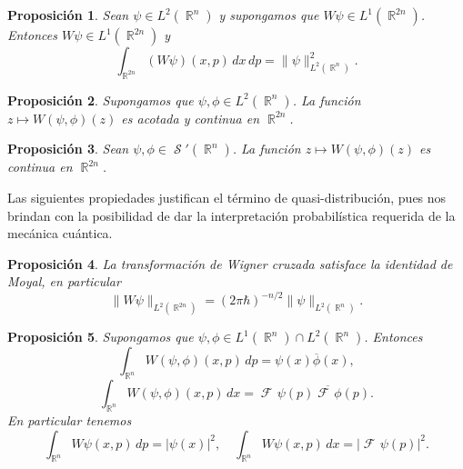 \documentclass[a4paper]{report}
\DeclareMathOperator{\R}{\mathbb{R}}
\DeclareMathOperator{\Sz}{\mathcal S}
\DeclareMathOperator{\Fr}{\mathcal{F}\!}
\newtheorem{proposition}{Proposición}
\begin{document}
  \begin{proposition}
    Sean $\psi \in L^2(\R^{n})$ y supongamos que $W\psi \in
    L^{1}(\R^{2n})$. Entonces $W\psi \in L^{1}(\R^{2n})$ y
    \begin{equation}
      \int_{\R^{2n}} (W\psi)(x,p) \, dx \, dp 
      = \|\psi\|^2_{L^2(\R^{n})}.
    \end{equation}
  \end{proposition}

  \begin{proposition}
    Supongamos que $\psi, \phi \in L^2(\R^{n})$. La función
    $z \mapsto W(\psi,\phi)(z)$ es acotada y continua en
    $\R^{2n}$.
  \end{proposition}

  \begin{proposition}
    Sean $\psi,\phi \in \Sz'(\R^{n})$. La función $z
    \mapsto W(\psi,\phi)(z)$ es continua en $\R^{2n}$.
  \end{proposition}

  Las siguientes propiedades justifican el término de
  quasi-distribución, pues nos brindan con la posibilidad de
  dar la interpretación probabilística requerida de la
  mecánica cuántica.
  \begin{proposition}
    La transformación de Wigner cruzada satisface la
    identidad de Moyal, en particular
    \begin{equation}
      \|W\psi\|_{L^2(\R^{2n})}
      = (2\pi\hbar)^{-n / 2} \|\psi\|_{L^2(\R^{n})}.
    \end{equation}
  \end{proposition}

  \begin{proposition}
    Supongamos que $\psi, \phi \in L^{1}(\R^{n}) \cap
    L^2(\R^{n})$. Entonces
    \begin{equation}
      \int_{\R^{n}} W(\psi,\phi)(x,p) \, dp
      = \psi(x)\overline{\phi}(x),
    \end{equation}
    \begin{equation}
      \int_{\R^{n}} W(\psi,\phi)(x,p) \, dx
      = \Fr\psi(p) \overline{\Fr\phi}(p).
    \end{equation}
    En particular tenemos
    \begin{equation}
      \int_{\R^{n}} W\psi(x,p) \, dp
      = |\psi(x)|^2,
      \quad
      \int_{\R^{n}} W\psi(x,p) \, dx
      = |\Fr\psi(p)|^2.
    \end{equation}
  \end{proposition}
\end{document}

